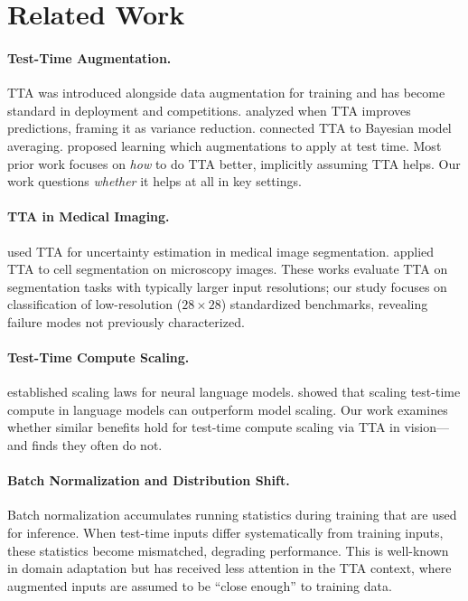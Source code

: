 \documentclass{article}
\theoremstyle{plain}
\theoremstyle{definition}
\theoremstyle{remark}
\begin{document}
\section{Related Work}
\label{sec:related}

\paragraph{Test-Time Augmentation.}
TTA was introduced alongside data augmentation for training \citep{krizhevsky2017imagenet, simonyan2015very} and has become standard in deployment and competitions. \citet{shanmugam2021better} analyzed when TTA improves predictions, framing it as variance reduction. \citet{kimura2021understanding} connected TTA to Bayesian model averaging. \citet{lyzhov2020greedy} proposed learning which augmentations to apply at test time. Most prior work focuses on \emph{how} to do TTA better, implicitly assuming TTA helps. Our work questions \emph{whether} it helps at all in key settings.

\paragraph{TTA in Medical Imaging.}
\citet{wang2019aleatoric} used TTA for uncertainty estimation in medical image segmentation. \citet{moshkov2020test} applied TTA to cell segmentation on microscopy images. These works evaluate TTA on segmentation tasks with typically larger input resolutions; our study focuses on classification of low-resolution ($28 \times 28$) standardized benchmarks, revealing failure modes not previously characterized.

\paragraph{Test-Time Compute Scaling.}
\citet{kaplan2020scaling} established scaling laws for neural language models. \citet{snell2024scaling} showed that scaling test-time compute in language models can outperform model scaling. Our work examines whether similar benefits hold for test-time compute scaling via TTA in vision---and finds they often do not.

\paragraph{Batch Normalization and Distribution Shift.}
Batch normalization \citep{goodfellow2016deep} accumulates running statistics during training that are used for inference. When test-time inputs differ systematically from training inputs, these statistics become mismatched, degrading performance. This is well-known in domain adaptation but has received less attention in the TTA context, where augmented inputs are assumed to be ``close enough'' to training data.
\end{document}
